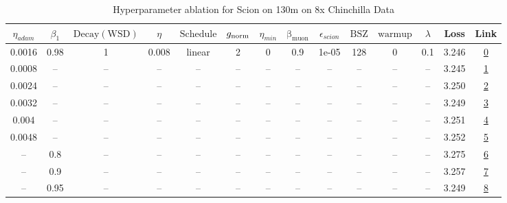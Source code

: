 \begin{table}[H]
\centering
\caption{Hyperparameter ablation for Scion on 130m on 8x Chinchilla Data}
\label{tab:ablation_scion_130m_on_8x_chinchilla_data}
\begin{tabular}{cccccccccccccc}
\toprule
$\eta_{adam}$ & $\beta_1$ & $\mathrm{Decay (WSD)}$ & $\eta$ & $\mathrm{Schedule}$ & $g_{\mathrm{norm}}$ & $\eta_{min}$ & $\mathrm{\beta_{muon}}$ & $\epsilon_{scion}$ & $\mathrm{BSZ}$ & $\mathrm{warmup}$ & $\lambda$ & Loss & Link \\
\midrule
0.0016 & 0.98 & 1 & 0.008 & linear & 2 & 0 & 0.9 & 1e-05 & 128 & 0 & 0.1 & 3.246 & \href{https://wandb.ai/marin-community/optimizer-scaling/runs/sweep-130m-21B-scion51ccaelr0.008-wd0.1-minlr0-warmup0-b10.98-gn-4abd83}{0} \\
\midrule
0.0008 & -- & -- & -- & -- & -- & -- & -- & -- & -- & -- & -- & 3.245 & \href{https://wandb.ai/marin-community/optimizer-scaling/runs/sweep-130m-21B-scionpc9b6c6lr0.008-wd0.1-minlr0-warmup0-b10.98-g-847bd4}{1} \\
0.0024 & -- & -- & -- & -- & -- & -- & -- & -- & -- & -- & -- & 3.250 & \href{https://wandb.ai/marin-community/optimizer-scaling/runs/sweep-130m-21B-scion2c2f99lr0.008-wd0.1-minlr0-warmup0-b10.98-gn-297c7d}{2} \\
0.0032 & -- & -- & -- & -- & -- & -- & -- & -- & -- & -- & -- & 3.249 & \href{https://wandb.ai/marin-community/optimizer-scaling/runs/sweep-130m-21B-scion6d330dlr0.008-wd0.1-minlr0-warmup0-b10.98-gn-ee71b4}{3} \\
0.004 & -- & -- & -- & -- & -- & -- & -- & -- & -- & -- & -- & 3.251 & \href{https://wandb.ai/marin-community/optimizer-scaling/runs/sweep-130m-21B-scion135c27lr0.008-wd0.1-minlr0-warmup0-b10.98-gn-e8fbd7}{4} \\
0.0048 & -- & -- & -- & -- & -- & -- & -- & -- & -- & -- & -- & 3.252 & \href{https://wandb.ai/marin-community/optimizer-scaling/runs/sweep-130m-21B-scion1fa022lr0.008-wd0.1-minlr0-warmup0-b10.98-gn-bc1b5f}{5} \\
-- & 0.8 & -- & -- & -- & -- & -- & -- & -- & -- & -- & -- & 3.275 & \href{https://wandb.ai/marin-community/optimizer-scaling/runs/sweep-130m-21B-scion1d7c34lr0.008-wd0.1-minlr0-warmup0-b10.8-gn2-fd6d80}{6} \\
-- & 0.9 & -- & -- & -- & -- & -- & -- & -- & -- & -- & -- & 3.257 & \href{https://wandb.ai/marin-community/optimizer-scaling/runs/sweep-130m-21B-scion766235lr0.008-wd0.1-minlr0-warmup0-b10.9-gn2-b7a715}{7} \\
-- & 0.95 & -- & -- & -- & -- & -- & -- & -- & -- & -- & -- & 3.249 & \href{https://wandb.ai/marin-community/optimizer-scaling/runs/sweep-130m-21B-scionj3bd025lr0.008-wd0.1-minlr0-warmup0-b10.95-g-681640}{8} \\

\end{tabular}
\end{table}
